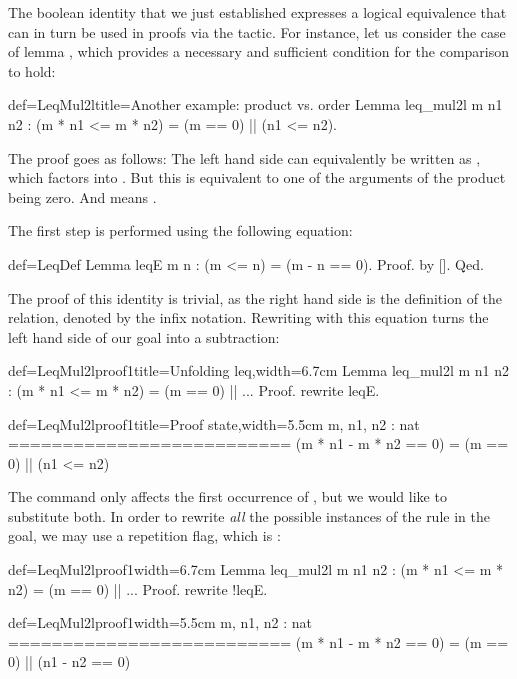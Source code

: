 The boolean identity  that we just established expresses a
logical equivalence that can in turn be used in proofs via the
 tactic. For instance, let us consider the case of lemma
, which provides a necessary and sufficient condition
for the comparison  to hold:

\begin{coq}{def=LeqMul2l}{title=Another example: product vs. order}
Lemma leq_mul2l m n1 n2 : (m * n1 <= m * n2) = (m == 0) || (n1 <= n2).
\end{coq}

The proof goes as follows: The left
hand side can equivalently be written as , which
factors into . But this is equivalent to one
of the arguments of the product being zero. And 
means .

The first step is performed using the following equation:

\begin{coq}{def=LeqDef}{}
Lemma leqE m n : (m <= n) = (m - n == 0).
Proof. by []. Qed.
\end{coq}
The proof of this identity is trivial, as the right hand side is the
definition of the  relation, denoted by the \C{<=} infix
notation. Rewriting with this equation turns the left hand side of our
goal into a subtraction:

\begin{coq}{def=LeqMul2lproof1}{title=Unfolding leq,width=6.7cm}
Lemma leq_mul2l m n1 n2 :
 (m * n1 <= m * n2) = (m == 0) || ...
Proof.
rewrite leqE.
\end{coq}
\begin{coqout}{def=LeqMul2lproof1}{title=Proof state,width=5.5cm}
m, n1, n2 : nat
==========================
(m * n1 - m * n2 == 0) =
  (m == 0) || (n1 <= n2)
\end{coqout}

The command  only affects the first
occurrence of \C{<=}, but we would like to substitute both. In order to
rewrite \emph{all} the possible instances of the rule in the goal, we
may use a repetition flag, which is \C{!}:

\begin{coq}{def=LeqMul2lproof1}{width=6.7cm}
Lemma leq_mul2l m n1 n2 :
 (m * n1 <= m * n2) = (m == 0) || ...
Proof.
rewrite !leqE.
\end{coq}
\begin{coqout}{def=LeqMul2lproof1}{width=5.5cm}
m, n1, n2 : nat
==========================
(m * n1 - m * n2 == 0) =
  (m == 0) || (n1 - n2 == 0)
\end{coqout}

